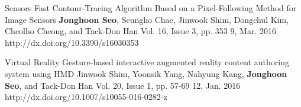 


\begin{cventries}

  \cvpublicationentry
    {Sensors} %
    {Fast Contour-Tracing Algorithm Based on a Pixel-Following Method for Image Sensors} %
    {\textbf{Jonghoon Seo}, Seungho Chae, Jinwook Shim, Dongchul Kim, Cheolho Cheong, and Tack-Don Han} %
    {Vol. 16, Issue 3, pp. 353}
    {9, Mar. 2016} %
    {http://dx.doi.org/10.3390/s16030353}

  \cvpublicationentry
    {Virtual Reality} %
    {Gesture-based interactive augmented reality content authoring system using HMD} %
    {Jinwook Shim, Yoonsik Yang, Nahyung Kang, \textbf{Jonghoon Seo}, and Tack-Don Han} %
    {Vol. 20, Issue 1, pp. 57-69}
    {12, Jan. 2016} %
    {http://dx.doi.org/10.1007/s10055-016-0282-z}

\end{cventries}

